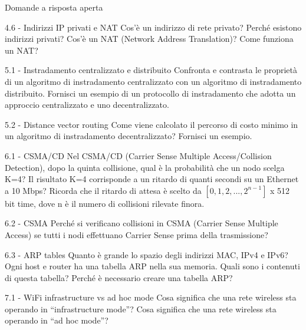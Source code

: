 \documentclass[a4paper]{article}
\begin{document}
\begin{quiz}{Domande a risposta aperta}
\begin{essay}[points=1]{4.6 - Indirizzi IP privati e NAT}
Cos'è un indirizzo di rete privato? Perché esistono indirizzi privati? Cos'è un NAT (Network Address Translation)? Come funziona un NAT?
\end{essay}


\begin{essay}[points=1]{5.1 - Instradamento centralizzato e distribuito}
Confronta e contrasta le proprietà di un algoritmo di instradamento centralizzato con un algoritmo di instradamento distribuito. Fornisci un esempio di un protocollo di instradamento che adotta un approccio centralizzato e uno decentralizzato.
\end{essay}

\begin{essay}[points=1]{5.2 - Distance vector routing}
Come viene calcolato il percorso di costo minimo in un algoritmo di instradamento decentralizzato? Fornisci un esempio.
\end{essay}



\begin{essay}[points=1]{6.1 - CSMA/CD}
Nel CSMA/CD (Carrier Sense Multiple Access/Collision Detection), dopo la quinta collisione, qual è la probabilità che un nodo scelga K=4? Il risultato K=4 corrisponde a un ritardo di quanti secondi su un Ethernet a 10 Mbps? Ricorda che il ritardo di attesa è scelto da $[0, 1, 2, ... , 2^{n-1}]$ x 512 bit time, dove n è il numero di collisioni rilevate finora.
\end{essay}

\begin{essay}[points=1]{6.2 - CSMA}
Perché si verificano collisioni in CSMA (Carrier Sense Multiple Access) se tutti i nodi effettuano Carrier Sense prima della trasmissione?
\end{essay}

\begin{essay}[points=1]{6.3 - ARP tables}
Quanto è grande lo spazio degli indirizzi MAC, IPv4 e IPv6? Ogni host e router ha una tabella ARP nella sua memoria. Quali sono i contenuti di questa tabella? Perché è necessario creare una tabella ARP?
\end{essay}

\begin{essay}[points=1]{7.1 - WiFi infrastructure vs ad hoc mode}
Cosa significa che una rete wireless sta operando in ``infrastructure mode''? Cosa significa che una rete wireless sta operando in ``ad hoc mode''?
\end{essay}


\end{quiz}
\end{document}
